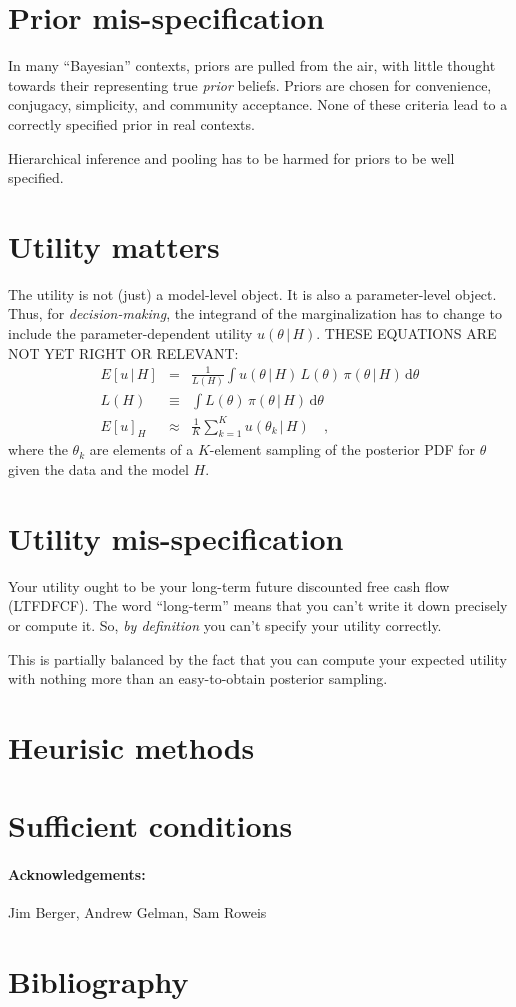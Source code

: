 \documentclass[12pt]{article}
\newcommand{\dd}{\mathrm{d}}
\newcommand{\given}{\,|\,}
\begin{document}
\section{Prior mis-specification}

In many ``Bayesian'' contexts, priors are pulled from the air,
  with little thought towards their representing true \emph{prior} beliefs.
Priors are chosen for convenience, conjugacy, simplicity, and community acceptance.
None of these criteria lead to a correctly specified prior in real contexts.

Hierarchical inference and pooling has to be harmed for priors to be well specified.

\section{Utility matters}

The utility is not (just) a model-level object.
It is also a parameter-level object.
Thus, for \emph{decision-making},
  the integrand of the marginalization has to change to include
  the parameter-dependent utility $u(\theta\given H)$.
THESE EQUATIONS ARE NOT YET RIGHT OR RELEVANT:
\begin{eqnarray}
E[u\given H] &=& \frac{1}{L(H)} \int u(\theta\given H)\,L(\theta)\,\pi(\theta\given H)\,\dd\theta
\\
L(H) &\equiv& \int L(\theta)\,\pi(\theta\given H)\,\dd\theta
\\
E[u]_H &\approx& \frac{1}{K} \sum_{k=1}^K u(\theta_k\given H)
\quad ,
\end{eqnarray}
where the $\theta_k$ are elements of a $K$-element sampling of the
posterior PDF for $\theta$ given the data and the model $H$.

\section{Utility mis-specification}

Your utility ought to be your long-term future discounted free cash flow (LTFDFCF).
The word ``long-term'' means that you can't write it down precisely or compute it.
So, \emph{by definition} you can't specify your utility correctly.

This is partially balanced by the fact that you can compute your expected utility with
  nothing more than an easy-to-obtain posterior sampling.

\section{Heurisic methods}

\section{Sufficient conditions}


\paragraph{Acknowledgements:}
Jim Berger,
Andrew Gelman,
Sam Roweis

\section*{Bibliography}
\end{document}
